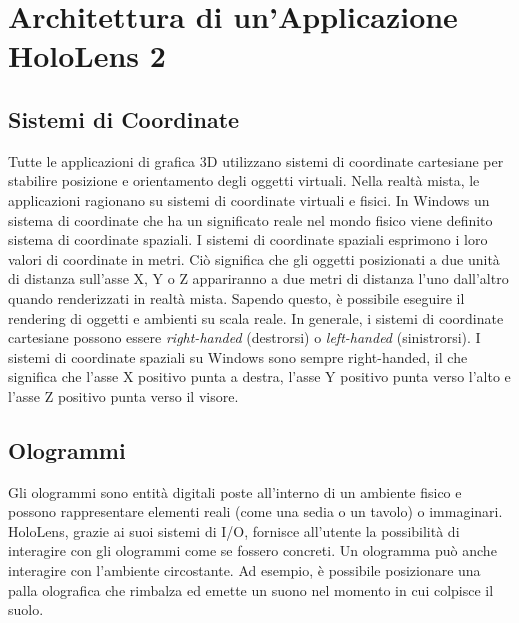 \section{Architettura di un'Applicazione HoloLens 2}\label{sec:Sezione2.2}

\subsection{Sistemi di Coordinate}
Tutte le applicazioni di grafica 3D utilizzano sistemi di coordinate cartesiane per stabilire posizione e orientamento degli oggetti virtuali.
Nella realtà mista, le applicazioni ragionano su sistemi di coordinate virtuali e fisici.
In Windows un sistema di coordinate che ha un significato reale nel mondo fisico viene definito sistema di coordinate spaziali.
I sistemi di coordinate spaziali esprimono i loro valori di coordinate in metri. Ciò significa che gli oggetti posizionati a due unità di distanza sull'asse X, Y o Z appariranno a due metri di distanza l'uno dall'altro quando renderizzati in realtà mista.
Sapendo questo, è possibile eseguire il rendering di oggetti e ambienti su scala reale.
In generale, i sistemi di coordinate cartesiane possono essere \textit{right-handed} (destrorsi) o \textit{left-handed} (sinistrorsi).
I sistemi di coordinate spaziali su Windows sono sempre right-handed, il che significa che l'asse X positivo punta a destra, l'asse Y positivo punta verso l'alto e l'asse Z positivo punta verso il visore.

\subsection{Ologrammi}
Gli ologrammi sono entità digitali poste all’interno di un ambiente fisico e possono rappresentare elementi reali (come una sedia o un tavolo) o immaginari.
HoloLens, grazie ai suoi sistemi di I/O, fornisce all’utente la possibilità di interagire con gli ologrammi come se fossero concreti.
Un ologramma può anche interagire con l'ambiente circostante. Ad esempio, è possibile posizionare una palla olografica che rimbalza ed emette un suono nel momento in cui colpisce il suolo.

